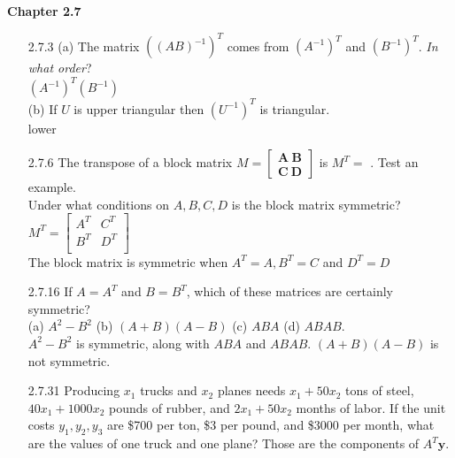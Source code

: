 \documentclass[10pt,twoside,reqno]{article}
\begin{document}
\vspace{5mm}
\textbf{Chapter 2.7}
\begin{enumerate}
\item[2.7.3] (a) The matrix $((AB)^{-1})^T$ comes from $(A^{-1})^T$ and $(B^{-1})^T$. \textit{In what order}?\\
\vspace{3mm}
$(A^{-1})^T(B^{-1})$\\
\vspace{3mm}
(b) If $U$ is upper triangular then $(U^{-1})^T$ is \underline{\hspace{6mm}} triangular.\\
\vspace{3mm}
lower\\
\vspace{3mm}
\item[2.7.6] The transpose of a block matrix $M = \left[\begin{smallmatrix} \pmb{A}\ \pmb{B} \\ \pmb{C}\ \pmb{D} \end{smallmatrix} \right]$ is $M^T =$ \underline{\hspace{6mm}}. Test an example.\\
Under what conditions on $A, B, C, D$ is the block matrix symmetric?\\
\vspace{3mm}
$
$$
M^T =
\begin{bmatrix}
A^T & C^T\\
B^T & D^T\\
\end{bmatrix}
$$
$\\
The block matrix is symmetric when $A^T = A, B^T = C$ and $D^T = D$\\
\item[2.7.16] If $A = A^{T}$ and $B = B^{T}$, which of these matrices are certainly symmetric?\\
(a) $A^2 - B^2$ \hspace{10mm} (b) $(A + B)(A - B)$ \hspace{10mm} (c) $ABA$ \hspace{10mm} (d) $ABAB$.\\
\vspace{3mm}
$A^2 - B^2$ is symmetric, along with $ABA$ and $ABAB$. $(A + B)(A - B)$ is not symmetric.\\
\item[2.7.31] Producing $x_1$ trucks and $x_2$ planes needs $ x_1 + 50x_2$ tons of steel, $40x_1 + 1000x_2$ pounds of rubber, and $2x_1 + 50x_2$ months of labor. If the unit costs $y_1, y_2, y_3$ are \$700 per ton, \$3 per pound, and \$3000 per month, what are the values of one truck and one plane? Those are the components of $A^T\pmb{y}$.\\

\end{enumerate}
\end{document}
